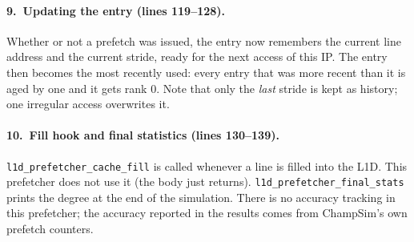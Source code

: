 \documentclass[11pt,a4paper]{article}
\begin{document}
\paragraph{9.\ Updating the entry (lines 119--128).}

Whether or not a prefetch was issued, the entry now remembers the current line address and the
current stride, ready for the next access of this IP. The entry then becomes the most recently
used: every entry that was more recent than it is aged by one and it gets rank 0. Note that only
the \emph{last} stride is kept as history; one irregular access overwrites it.

\paragraph{10.\ Fill hook and final statistics (lines 130--139).}

\texttt{l1d\_prefetcher\_cache\_fill} is called whenever a line is filled into the L1D. This
prefetcher does not use it (the body just returns). \texttt{l1d\_prefetcher\_final\_stats} prints the
degree at the end of the simulation. There is no accuracy tracking in this prefetcher; the
accuracy reported in the results comes from ChampSim's own prefetch counters.
\end{document}
